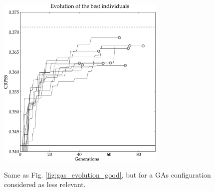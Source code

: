 \documentclass{ametsoc}
\begin{document}
\begin{figure}[t]
	\begin{center}
		\noindent\includegraphics[width=19pc,angle=0]{fig04.pdf}\\
	\end{center}
	\caption{Same as Fig. \ref{fig:gas_evolution_good}, but for a GAs configuration considered as less relevant.}
	\label{fig:gas_evolution_bad}
\end{figure}
\end{document}
